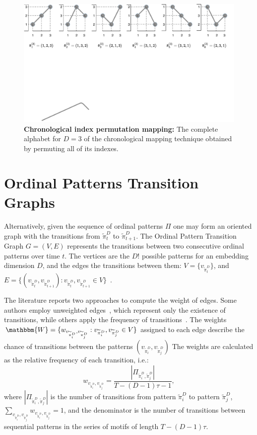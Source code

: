 \begin{figure}
    \centering
    \includegraphics[width=\linewidth]{Figures/Chronological.pdf}
    \caption{\textbf{Chronological index permutation mapping:} The complete alphabet for $D = 3$ of the chronological mapping technique obtained by permuting all of its indexes.}
    \label{fig:Chronological}
\end{figure}

\section{Ordinal Patterns Transition Graphs}\label{sub:OPTG}

Alternatively, given the sequence of ordinal patterns $\Pi$ one may form an oriented graph with the transitions from $\widetilde\pi_t^D$ to $\widetilde\pi_{t+1}^D$. 
The Ordinal Pattern Transition Graph ${G} = ({V}, {E})$ 
represents the transitions between two consecutive ordinal patterns over time $t$.
The vertices are the $D!$ possible patterns for an embedding dimension $D$, and the edges the transitions between them:
$V = \{v_{\widetilde\pi_t^D}\}$, and 
$E = \{(v_{\widetilde\pi_t^D}, v_{\widetilde\pi_{t+1}^D}): v_{\widetilde\pi_t^D}, v_{\widetilde\pi_{t+1}^D} \in V \}$~\citep{Borges2019Transition}.

The literature reports two approaches to compute the weight of edges.
Some authors employ unweighted edges~\citep{McCullough2015lagged, Kulp2016ordinal}, which represent only the existence of transitions, while others apply the frequency of transitions~\citep{Sorrentino2015periodic, Zhang2017ConstructingOP}.
The weights $\mathbbm{W} = \{w_{v_{\widetilde{\pi}^D_i}, v_{\widetilde\pi^D_j}}: v_{\widetilde\pi^D_i}, v_{\widetilde\pi^D_j} \in V \}$ assigned to each edge describe the chance of transitions between the patterns $(v_{\widetilde\pi^D_i}, v_{\widetilde\pi^D_j})$
The weights are calculated as the relative frequency of each transition, i.e.:
\begin{equation}
w_{v_{\widetilde\pi^D_i}, v_{\widetilde\pi^D_j}} = \frac{|\Pi_{\widetilde\pi^D_i,\widetilde\pi^D_j}|}{T-(D-1)\tau-1},
\end{equation}
where $|\Pi_{\widetilde\pi^D_i,\widetilde\pi^D_j}|$ is the number of transitions from pattern $\widetilde\pi^D_i$ to pattern $\widetilde\pi^D_j$, $\sum_{v_{\widetilde\pi^D_i}, v_{\widetilde\pi^D_j}}w_{v_{\widetilde\pi^D_i}, v_{\widetilde\pi^D_j}} = 1$,
and the denominator is the number of transitions between sequential patterns in the series of motifs of length $T-(D-1)\tau$.

